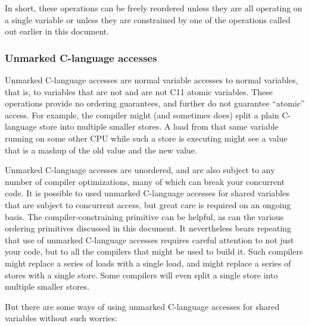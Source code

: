 In short, these operations can be freely reordered unless they are all
operating on a single variable or unless they are constrained by one of
the operations called out earlier in this document.


\subsubsection{Unmarked C-language accesses}

Unmarked C-language accesses are normal variable accesses to normal
variables, that is, to variables that are not  and are not
C11 atomic variables.
These operations provide no ordering guarantees, and further do not
guarantee ``atomic'' access.
For example, the compiler might (and sometimes does) split a plain
C-language store into multiple smaller stores.
A load from that same variable running on some other CPU while such
a store is executing might see a value that is a mashup of the old
value and the new value.

Unmarked C-language accesses are unordered, and are also subject to
any number of compiler optimizations, many of which can break your
concurrent code.
It is possible to used unmarked C-language accesses for shared variables
that are subject to concurrent access, but great care is required on
an ongoing basis.
The compiler-constraining  primitive can be helpful, as
can the various ordering primitives discussed in this document.
It nevertheless bears repeating that use of unmarked C-language accesses
requires careful attention to not just your code, but to all the
compilers that might be used to build it.
Such compilers might replace a series of loads with a single load,
and might replace a series of stores with a single store.
Some compilers will even split a single store into multiple smaller stores.

But there are some ways of using unmarked C-language accesses for shared
variables without such worries:


